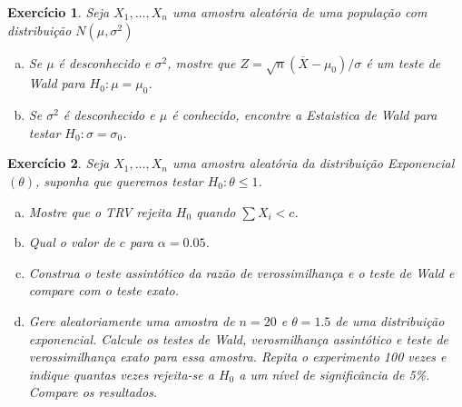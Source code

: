 \documentclass[letter,11pt]{article}
\newtheorem{exer}{Exercício}
\begin{document}
\begin{exer} \rm
Seja $X_1, \ldots, X_n$ uma amostra aleatória de uma população com distribuição $N(\mu, \sigma^2)$

\begin{enumerate}[a)]

\item Se $\mu$ é desconhecido e $\sigma^2$, mostre que $Z=\sqrt{n}(\overline{X}-\mu_0)/\sigma$ é um teste de Wald para $H_0:\mu=\mu_0$.

\item Se $\sigma^2$ é desconhecido e $\mu$ é conhecido, encontre a Estaistica de Wald para testar $H_0:\sigma=\sigma_0$.
\end{enumerate}
\end{exer}


\begin{exer} \rm
Seja $X_1, \ldots, X_n$ uma amostra aleatória da distribuição Exponencial $(\theta)$, suponha que queremos testar $H_0:\theta \leq 1$.

\begin{enumerate}[a)]

\item Mostre que o TRV rejeita $H_0$ quando $\sum X_i<c$. 

\item Qual o valor de $c$ para $\alpha=0.05$.

\item Construa o teste assintótico da razão de verossimilhança e o teste de Wald e compare com o teste exato.

\item Gere aleatoriamente uma amostra de $n=20$ e $\theta=1.5$ de uma distribuição exponencial. Calcule os testes de Wald, verosmilhança assintótico e teste de verossimilhança exato para essa amostra. Repita o experimento 100 vezes e indique quantas vezes rejeita-se a $H_0$ a um nível de significância de 5\%. Compare os resultados.

\end{enumerate}
\end{exer}
\end{document}
